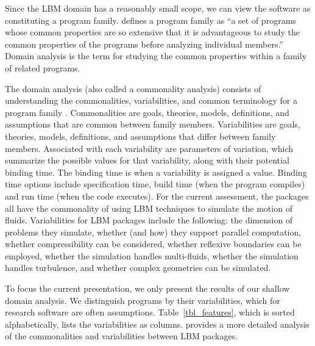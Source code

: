 \documentclass[final, 3p, times, authoryear]{elsarticle}
\begin{document}
Since the LBM domain has a reasonably small scope, we can view the software as
constituting a program family.  \citet{parnas1976design} defines a program
family as ``a set of programs whose common properties are so extensive that it
is advantageous to study the common properties of the programs before analyzing
individual members.'' Domain analysis is the term for studying the common
properties within a family of related programs.

The domain analysis (also called a commonality analysis) consists of
understanding the commonalities, variabilities, and common terminology for a
program family \citep{weiss1997defining}. Commonalities are goals, theories,
models, definitions, and assumptions that are common between family members.
Variabilities are goals, theories, models, definitions, and assumptions that
differ between family members. Associated with each variability are parameters
of variation, which summarize the possible values for that variability, along
with their potential binding time. The binding time is when a variability is
assigned a value. Binding time options include specification time, build time
(when the program compiles) and run time (when the code executes). For the
current assessment, the packages all have the commonality of using LBM
techniques to simulate the motion of fluids. Variabilities for LBM packages
include the following: the dimension of problems they simulate, whether (and
how) they support parallel computation, whether compressibility can be
considered, whether reflexive boundaries can be employed, whether the simulation
handles multi-fluids, whether the simulation handles turbulence, and whether
complex geometries can be simulated. 

To focus the current presentation, we only present the results of our shallow
domain analysis. We distinguish programs by their variabilities, which for
research software are often assumptions. Table~\ref{tbl_features}, which is
sorted alphabetically, lists the variabilities as columns. \citet{Michalski2021}
provides a more detailed analysis of the commonalities and variabilities between
LBM packages.
\end{document}
